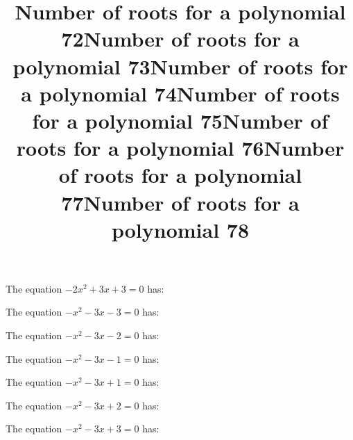 \documentclass{article}
\begin{document}
\begin{category}
\begin{question}[multichoice]
\end{question}
\begin{question}[multichoice]
\title{Number of roots for a polynomial 72}
The equation $- 2 x^{2} + 3 x + 3=0$ has:


\end{question}
\begin{question}[multichoice]
\title{Number of roots for a polynomial 73}
The equation $- x^{2} - 3 x - 3=0$ has:


\end{question}
\begin{question}[multichoice]
\title{Number of roots for a polynomial 74}
The equation $- x^{2} - 3 x - 2=0$ has:


\end{question}
\begin{question}[multichoice]
\title{Number of roots for a polynomial 75}
The equation $- x^{2} - 3 x - 1=0$ has:


\end{question}
\begin{question}[multichoice]
\title{Number of roots for a polynomial 76}
The equation $- x^{2} - 3 x + 1=0$ has:


\end{question}
\begin{question}[multichoice]
\title{Number of roots for a polynomial 77}
The equation $- x^{2} - 3 x + 2=0$ has:


\end{question}
\begin{question}[multichoice]
\title{Number of roots for a polynomial 78}
The equation $- x^{2} - 3 x + 3=0$ has:


\end{question}
\end{category}
\end{document}
